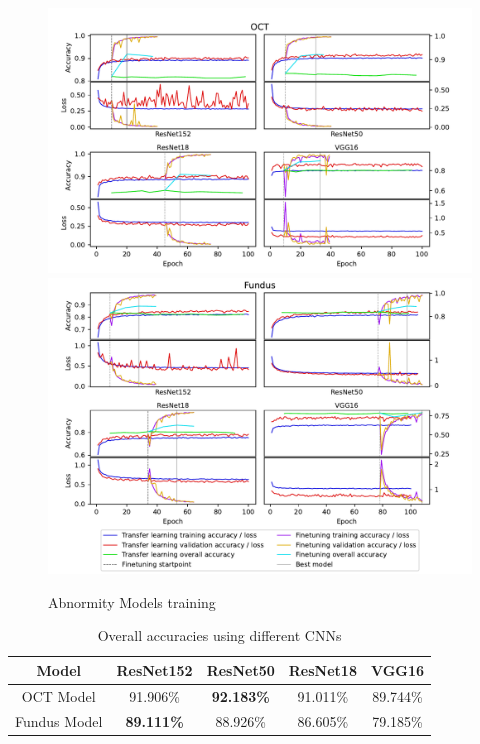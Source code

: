 \documentclass{article}
\begin{document}
	\begin{figure}[htbp]
		\centering
		\includegraphics[width=\linewidth]{Figs/abnormity_OCT_loss_and_acc.pdf}
		\includegraphics[width=\linewidth]{Figs/abnormity_Fundus_loss_and_acc.pdf}
		\caption{Abnormity Models training }
		\label{fig:A_train}
	\end{figure}
	
	{
	\fontsize{9}{12}\selectfont
	{
		\begin{table}
			\centering
			\caption{Overall accuracies using different CNNs}
			\label{tb:A_accuracies}
			\begin{tabular}{ccccc}
				\toprule
				Model&ResNet152&ResNet50&ResNet18&VGG16\\
				\midrule
				OCT Model   &91.906\%&\textbf{92.183\%}&91.011\%&89.744\% \\
				Fundus Model&\textbf{89.111\%}&88.926\%&86.605\%&79.185\% \\
				\bottomrule
			\end{tabular}
		\end{table}
	}
	}	
	
\end{document}
